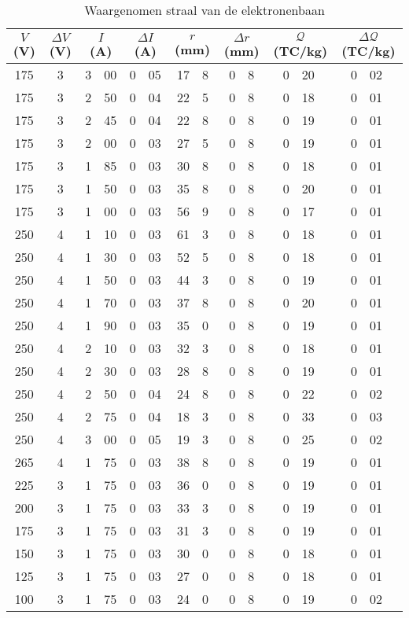 \begin{table}
\caption{Waargenomen straal van de elektronenbaan}
\label{tabel-elektron}
\begin{center}
\begin{tabular}{c|c||r@{.}l|r@{.}l||r@{.}l|r@{.}l||r@{.}l|r@{.}l}
\multicolumn{1}{c|}{$V$ (V)}&
\multicolumn{1}{c||}{$\Delta V$ (V)}&
\multicolumn{2}{c|}{$I$ (A)}&
\multicolumn{2}{c||}{$\Delta I$ (A)}&
\multicolumn{2}{c|}{$r$ (mm)}&
\multicolumn{2}{c||}{$\Delta r$ (mm)}&
\multicolumn{2}{c|}{$\mathcal{Q}$ (TC/kg)}&
\multicolumn{2}{c}{$\Delta \mathcal{Q}$ (TC/kg)}\\\hline\hline
175&	3&	3&00&	0&05&	17&8&	0&8&	0&20&	0&02\\
175&	3&	2&50&	0&04&	22&5&	0&8&	0&18&	0&01\\
175&	3&	2&45&	0&04&	22&8&	0&8&	0&19&	0&01\\
175&	3&	2&00&	0&03&	27&5&	0&8&	0&19&	0&01\\
175&	3&	1&85&	0&03&	30&8&	0&8&	0&18&	0&01\\
175&	3&	1&50&	0&03&	35&8&	0&8&	0&20&	0&01\\
175&	3&	1&00&	0&03&	56&9&	0&8&	0&17&	0&01\\\hline
250&	4&	1&10&	0&03&	61&3&	0&8&	0&18&	0&01\\
250&	4&	1&30&	0&03&	52&5&	0&8&	0&18&	0&01\\
250&	4&	1&50&	0&03&	44&3&	0&8&	0&19&	0&01\\
250&	4&	1&70&	0&03&	37&8&	0&8&	0&20&	0&01\\
250&	4&	1&90&	0&03&	35&0&	0&8&	0&19&	0&01\\
250&	4&	2&10&	0&03&	32&3&	0&8&	0&18&	0&01\\
250&	4&	2&30&	0&03&	28&8&	0&8&	0&19&	0&01\\
250&	4&	2&50&	0&04&	24&8&	0&8&	0&22&	0&02\\
250&	4&	2&75&	0&04&	18&3&	0&8&	0&33&	0&03\\
250&	4&	3&00&	0&05&	19&3&	0&8&	0&25&	0&02\\\hline
265&	4&	1&75&	0&03&	38&8&	0&8&	0&19&	0&01\\
225&	3&	1&75&	0&03&	36&0&	0&8&	0&19&	0&01\\
200&	3&	1&75&	0&03&	33&3&	0&8&	0&19&	0&01\\
175&	3&	1&75&	0&03&	31&3&	0&8&	0&19&	0&01\\
150&	3&	1&75&	0&03&	30&0&	0&8&	0&18&	0&01\\
125&	3&	1&75&	0&03&	27&0&	0&8&	0&18&	0&01\\
100&	3&	1&75&	0&03&	24&0&	0&8&	0&19&	0&02\\\hline

\end{tabular}
\end{center}
\end{table}
